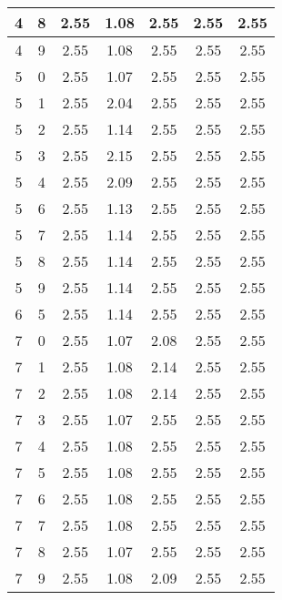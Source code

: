 \begin{longtable}{|c|c||c||c|c||c|c|}
	4 & 8 & 2.55 & 1.08 & 2.55 & 2.55 & 2.55 \\ \hline
	4 & 9 & 2.55 & 1.08 & 2.55 & 2.55 & 2.55 \\ \hline
	5 & 0 & 2.55 & 1.07 & 2.55 & 2.55 & 2.55 \\ \hline
	5 & 1 & 2.55 & 2.04 & 2.55 & 2.55 & 2.55 \\ \hline
	5 & 2 & 2.55 & 1.14 & 2.55 & 2.55 & 2.55 \\ \hline
	5 & 3 & 2.55 & 2.15 & 2.55 & 2.55 & 2.55 \\ \hline
	5 & 4 & 2.55 & 2.09 & 2.55 & 2.55 & 2.55 \\ \hline
	5 & 6 & 2.55 & 1.13 & 2.55 & 2.55 & 2.55 \\ \hline
	5 & 7 & 2.55 & 1.14 & 2.55 & 2.55 & 2.55 \\ \hline
	5 & 8 & 2.55 & 1.14 & 2.55 & 2.55 & 2.55 \\ \hline
	5 & 9 & 2.55 & 1.14 & 2.55 & 2.55 & 2.55 \\ \hline
	6 & 5 & 2.55 & 1.14 & 2.55 & 2.55 & 2.55 \\ \hline
	7 & 0 & 2.55 & 1.07 & 2.08 & 2.55 & 2.55 \\ \hline
	7 & 1 & 2.55 & 1.08 & 2.14 & 2.55 & 2.55 \\ \hline
	7 & 2 & 2.55 & 1.08 & 2.14 & 2.55 & 2.55 \\ \hline
	7 & 3 & 2.55 & 1.07 & 2.55 & 2.55 & 2.55 \\ \hline
	7 & 4 & 2.55 & 1.08 & 2.55 & 2.55 & 2.55 \\ \hline
	7 & 5 & 2.55 & 1.08 & 2.55 & 2.55 & 2.55 \\ \hline
	7 & 6 & 2.55 & 1.08 & 2.55 & 2.55 & 2.55 \\ \hline
	7 & 7 & 2.55 & 1.08 & 2.55 & 2.55 & 2.55 \\ \hline
	7 & 8 & 2.55 & 1.07 & 2.55 & 2.55 & 2.55 \\ \hline
	7 & 9 & 2.55 & 1.08 & 2.09 & 2.55 & 2.55 \\ \hline
\end{longtable}
\clearpage{}
